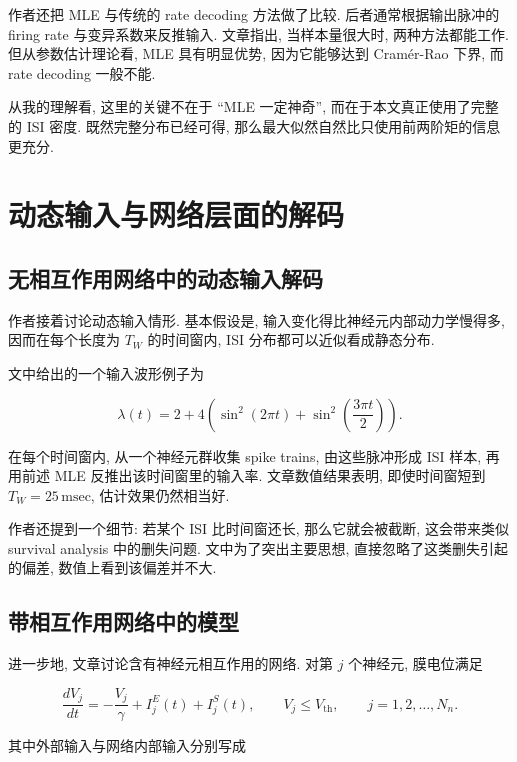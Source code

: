 \documentclass[oneside]{ctexart}
\begin{document}
作者还把 MLE 与传统的 rate decoding 方法做了比较. 后者通常根据输出脉冲的 firing rate 与变异系数来反推输入. 文章指出, 当样本量很大时, 两种方法都能工作. 但从参数估计理论看, MLE 具有明显优势, 因为它能够达到 Cram\'{e}r-Rao 下界, 而 rate decoding 一般不能.

从我的理解看, 这里的关键不在于 ``MLE 一定神奇'', 而在于本文真正使用了完整的 ISI 密度. 既然完整分布已经可得, 那么最大似然自然比只使用前两阶矩的信息更充分.

\section{动态输入与网络层面的解码}

\subsection{无相互作用网络中的动态输入解码}

作者接着讨论动态输入情形. 基本假设是, 输入变化得比神经元内部动力学慢得多, 因而在每个长度为 $T_W$ 的时间窗内, ISI 分布都可以近似看成静态分布.

文中给出的一个输入波形例子为

\begin{equation}
    \lambda(t)=2+4\left(\sin^2(2\pi t)+\sin^2\left(\dfrac{3\pi t}{2}\right)\right).
\end{equation}

在每个时间窗内, 从一个神经元群收集 spike trains, 由这些脉冲形成 ISI 样本, 再用前述 MLE 反推出该时间窗里的输入率. 文章数值结果表明, 即使时间窗短到 $T_W=25\,\mathrm{msec}$, 估计效果仍然相当好.

作者还提到一个细节: 若某个 ISI 比时间窗还长, 那么它就会被截断, 这会带来类似 survival analysis 中的删失问题. 文中为了突出主要思想, 直接忽略了这类删失引起的偏差, 数值上看到该偏差并不大.

\subsection{带相互作用网络中的模型}

进一步地, 文章讨论含有神经元相互作用的网络. 对第 $j$ 个神经元, 膜电位满足

\begin{equation}
    \dfrac{dV_j}{dt}
    =
    -\dfrac{V_j}{\gamma}
    +
    I_j^{E}(t)
    +
    I_j^{S}(t),
    \qquad
    V_j\leq V_{\mathrm{th}},
    \qquad
    j=1,2,\dots,N_n.
\end{equation}

其中外部输入与网络内部输入分别写成
\end{document}

